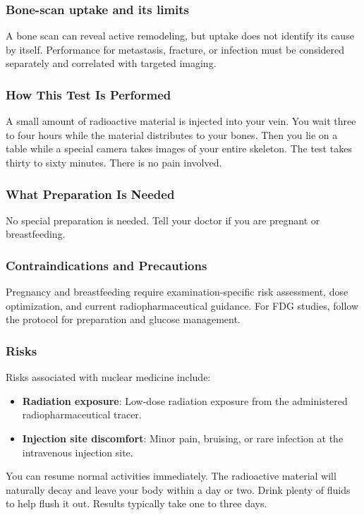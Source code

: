 \subsubsection*{Bone-scan uptake and its limits}
A bone scan can reveal active remodeling, but uptake does not identify its cause by itself. Performance for metastasis, fracture, or infection must be considered separately and correlated with targeted imaging.

\subsubsection*{How This Test Is Performed}
A small amount of radioactive material is injected into your vein. You wait three to four hours while the material distributes to your bones. Then you lie on a table while a special camera takes images of your entire skeleton. The test takes thirty to sixty minutes. There is no pain involved.

\subsubsection*{What Preparation Is Needed}
No special preparation is needed. Tell your doctor if you are pregnant or breastfeeding.

\subsubsection*{Contraindications and Precautions}
Pregnancy and breastfeeding require examination-specific risk assessment, dose optimization, and current radiopharmaceutical guidance. For FDG studies, follow the protocol for preparation and glucose management.

\subsubsection*{Risks}
Risks associated with nuclear medicine include:
\begin{itemize}
    \item \textbf{Radiation exposure}: Low-dose radiation exposure from the administered radiopharmaceutical tracer.
    \item \textbf{Injection site discomfort}: Minor pain, bruising, or rare infection at the intravenous injection site.
\end{itemize}


You can resume normal activities immediately. The radioactive material will naturally decay and leave your body within a day or two. Drink plenty of fluids to help flush it out. Results typically take one to three days.

